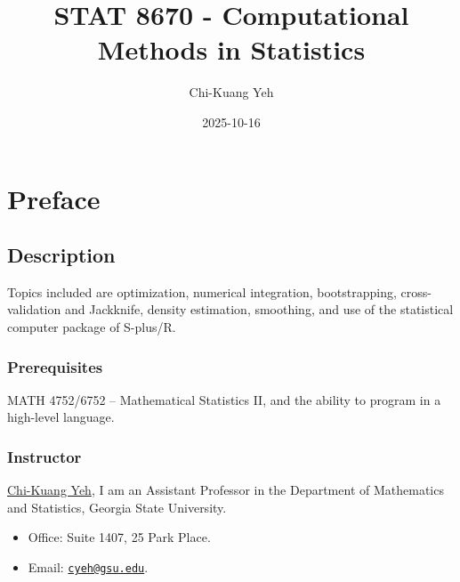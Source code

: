\documentclass[
  letterpaper,
  DIV=11,
  numbers=noendperiod]{scrreprt}
\title{STAT 8670 - Computational Methods in Statistics}
\author{Chi-Kuang Yeh}
\date{2025-10-16}
\providecommand{\tightlist}{%
  \setlength{\itemsep}{0pt}\setlength{\parskip}{0pt}}
\renewcommand*\contentsname{Table of contents}
\newcommand\contentsname{Table of contents}
\begin{document}
\maketitle

\renewcommand*\contentsname{Table of contents}
{
\hypersetup{linkcolor=}
\setcounter{tocdepth}{2}
\tableofcontents
}


\chapter*{Preface}\label{preface}


\section*{Description}\label{description}


Topics included are optimization, numerical integration, bootstrapping,
cross-validation and Jackknife, density estimation, smoothing, and use
of the statistical computer package of S-plus/R.

\subsection*{Prerequisites}\label{prerequisites}

MATH 4752/6752 -- Mathematical Statistics II, and the ability to program
in a high-level language.

\subsection*{Instructor}\label{instructor}

\href{https://chikuang.github.io/}{Chi-Kuang Yeh}, I am an Assistant
Professor in the Department of Mathematics and Statistics, Georgia State
University.

\begin{itemize}
\tightlist
\item
  Office: Suite 1407, 25 Park Place.
\item
  Email: \href{mailto:cyeh@gsu.edu}{\nolinkurl{cyeh@gsu.edu}}.
\end{itemize}
\end{document}
